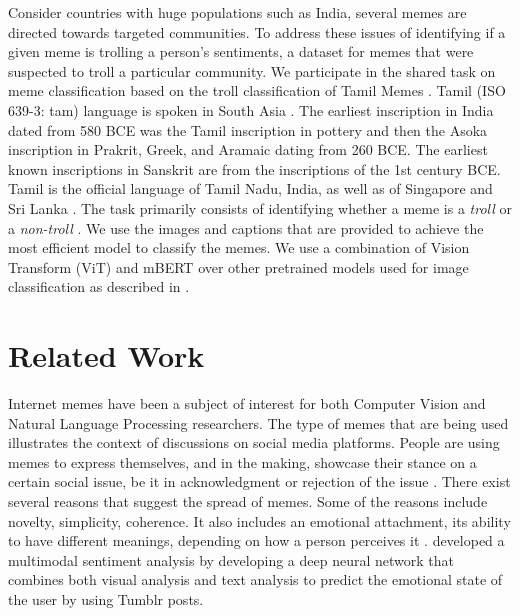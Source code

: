 \documentclass[11pt,a4paper]{article}
\begin{document}
Consider countries with huge populations such as India, several memes are directed towards targeted communities. To address these issues of identifying if a given meme is trolling a person's sentiments, a dataset for memes that were suspected to troll a particular community. We participate in the shared task on meme classification based on the troll classification of Tamil Memes \cite{suryawanshi-etal-2020-dataset}. Tamil (ISO 639-3: tam) language is spoken in South Asia \cite{chakravarthi2020leveraging}. The earliest inscription in India dated from 580 BCE was the Tamil inscription in pottery and then the Asoka inscription in Prakrit, Greek, and Aramaic dating from 260 BCE. The earliest known inscriptions in Sanskrit are from the inscriptions of the 1st century BCE. Tamil is the official language of Tamil Nadu, India,
as well as of Singapore and Sri Lanka \cite{chakravarthi-etal-2018-improving,chakravarthi-etal-2019-wordnet}.  The task primarily consists of identifying whether a meme is a \emph{troll} or a \emph{non-troll} \cite{dravidiantrollmeme-eacl}. We use the images and captions that are provided to achieve the most efficient model to classify the memes. We use a combination of Vision Transform (ViT) \cite{dosovitskiy2021an} and mBERT \cite{pires-etal-2019-multilingual} over other pretrained models used for image classification as described in \cite{Venkatesh2020TransferLB,10.3844/jcssp.2021.44.54}.
 

\section{Related Work}
\label{related work}
Internet memes have been a subject of interest for both Computer Vision and Natural Language Processing researchers. The type of memes that are being used illustrates the context of discussions on social media platforms. People are using memes to express themselves, and in the making, showcase their stance on a certain social issue, be it in acknowledgment or rejection of the issue \cite{8354676,boinepelli-etal-2020-sis,Gal2016ItGB}. There exist several reasons that suggest the spread of memes. Some of the reasons include novelty, simplicity, coherence. It also includes an emotional attachment, its ability to have different meanings, depending on how a person perceives it \cite{Nave2018TalkingIP,stephens2018ryan,Chielens2002OperationalizationOM}. \citeauthor{Hu_2018} developed a multimodal sentiment analysis by developing a deep neural network that combines both visual analysis and text analysis to predict the emotional state of the user by using Tumblr posts. 
\end{document}
